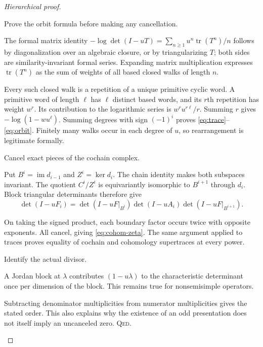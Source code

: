 \documentclass[11pt,a4paper]{article}
\theoremstyle{remark}\newtheorem{remark}[definition]{Remark}
\newcommand{\tr}{\operatorname{tr}}\newcommand{\im}{\operatorname{im}}
\newcommand{\QED}{\textsc{Qed}}
\begin{document}
\begin{proof}[Hierarchical proof]
\begin{steps}
\item Prove the orbit formula before making any cancellation.
\begin{steps}
\item The formal matrix identity $-\log\det(I-uT)=\sum_{n\ge1}u^n\tr(T^n)/n$ follows by diagonalization over an algebraic closure, or by triangularizing $T$; both sides are similarity-invariant formal series. Expanding matrix multiplication expresses $\tr(T^n)$ as the sum of weights of all based closed walks of length $n$.
\item Every such closed walk is a repetition of a unique primitive cyclic word. A primitive word of length $\ell$ has $\ell$ distinct based words, and its $r$th repetition has weight $w^r$. Its contribution to the logarithmic series is $w^ru^{r\ell}/r$. Summing $r$ gives $-\log(1-wu^\ell)$. Summing degrees with sign $(-1)^i$ proves \eqref{eq:trace}--\eqref{eq:orbit}. Finitely many walks occur in each degree of $u$, so rearrangement is legitimate formally.
\end{steps}
\item Cancel exact pieces of the cochain complex.
\begin{steps}
\item Put $B^i=\im d_{i-1}$ and $Z^i=\ker d_i$. The chain identity makes both subspaces invariant. The quotient $C^i/Z^i$ is equivariantly isomorphic to $B^{i+1}$ through $d_i$. Block triangular determinants therefore give
\[
\det(I-uF_i)=\det(I-uF|_{B^i})\det(I-uA_i)\det(I-uF|_{B^{i+1}}).
\]
\item On taking the signed product, each boundary factor occurs twice with opposite exponents. All cancel, giving \eqref{eq:cohom-zeta}. The same argument applied to traces proves equality of cochain and cohomology supertraces at every power.
\end{steps}
\item Identify the actual divisor.
\begin{steps}
\item A Jordan block at $\lambda$ contributes $(1-u\lambda)$ to the characteristic determinant once per dimension of the block. This remains true for nonsemisimple operators.
\item Subtracting denominator multiplicities from numerator multiplicities gives the stated order. This also explains why the existence of an odd presentation does not itself imply an uncanceled zero. \QED.
\end{steps}
\end{steps}
\end{proof}
\end{document}

